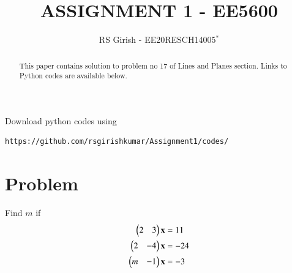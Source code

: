 \documentclass[journal,12pt,twocolumn]{IEEEtran}
\begin{document}
\makeatletter
{}
\makeatother
\let\StandardTheFigure\thefigure
\let\vec\mathbf
\renewcommand{\thefigure}{\theproblem}
\def\putbox#1#2#3{\makebox[0in][l]{\makebox[#1][l]{}\raisebox{\baselineskip}[0in][0in]{\raisebox{#2}[0in][0in]{#3}}}}
     \def\rightbox#1{\makebox[0in][r]{#1}}
     \def\centbox#1{\makebox[0in]{#1}}
     \def\topbox#1{\raisebox{-\baselineskip}[0in][0in]{#1}}
     \def\midbox#1{\raisebox{-0.5\baselineskip}[0in][0in]{#1}}
\vspace{3cm}
\title{
ASSIGNMENT 1 - EE5600
	}
\author{ RS Girish - EE20RESCH14005$^{*}$%
	}	

\maketitle
\newpage
\tableofcontents
\bigskip
\renewcommand{\thefigure}{\theenumi}
\renewcommand{\thetable}{\theenumi}

\begin{abstract}
This paper contains solution to problem no 17 of Lines and Planes section.
Links to Python codes are available below.  
\end{abstract}
Download python codes using 
\begin{lstlisting}
https://github.com/rsgirishkumar/Assignment1/codes/
\end{lstlisting}
\section{Problem}
Find $m$ if 
\begin{align}
\myvec{2 & 3 }\vec{x}&=11\\
\myvec{2 & -4 }\vec{x}&=-24\\
\myvec{m & -1 }\vec{x}&=-3
\end{align}
\end{document}
